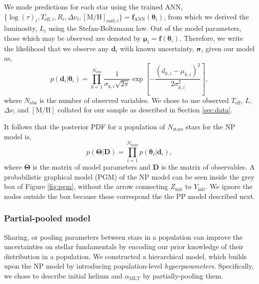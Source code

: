 \documentclass[fleqn,usenatbib]{mnras}
\newcommand{\dnu}{\ensuremath{\Delta\nu}}
\newcommand{\metallicity}{\ensuremath{[\mathrm{M}/\mathrm{H}]}}
\newcommand{\teff}{\ensuremath{T_\mathrm{eff}}}
\newcommand{\mlt}{\ensuremath{{\alpha_\mathrm{MLT}}}}
\begin{document}
We made predictions for each star using the trained ANN, $\{\log(\tau)_i, T_{\mathrm{eff}, i}, R_i, \dnu_i, \metallicity_{\mathrm{surf}, i}\} = \boldsymbol{f}_{\mathrm{ANN}}(\boldsymbol{\theta}_i)$, from which we derived the luminosity, $L_i$ using the Stefan-Boltzmann law. Out of the model parameters, those which may be observed are denoted by ${\boldsymbol{\mu}}_{i} = {\boldsymbol{f}}(\boldsymbol{\theta}_i)$. Therefore, we write the likelihood that we observe any $\boldsymbol{d}_i$ with known uncertainty, $\boldsymbol{\sigma}_{i}$ given our model as,
%
\begin{equation}
    p(\boldsymbol{d}_i | \boldsymbol{\theta}_i) = \prod_{k=1}^{N_\mathrm{obs}} \frac{1}{\sigma_{k, i} \sqrt{2\pi}} \exp\left[ - \frac{(d_{k, i} - \mu_{k, i})^2}{2 \sigma_{k, i}^2} \right],
    \label{eq:like}
\end{equation}
%
where $N_\mathrm{obs}$ is the number of observed variables. We chose to use observed $\teff$, $L$, $\dnu$, and $\metallicity$ collated for our sample as described in Section \ref{sec:data}.

It follows that the posterior PDF for a population of $N_\mathrm{stars}$ stars for the NP model is, 
%
\begin{equation}
    p(\boldsymbol{\Theta} | \boldsymbol{D}) = \prod_{i=1}^{N_{\mathrm{stars}}} p(\boldsymbol{\theta}_i | \boldsymbol{d}_i),   
\end{equation}
%
where $\boldsymbol{\Theta}$ is the matrix of model parameters and $\boldsymbol{D}$ is the matrix of observables. A probabilistic graphical model (PGM) of the NP model can be seen inside the grey box of Figure \ref{fig:pgm}, without the arrow connecting $Z_\mathrm{init}$ to $Y_\mathrm{init}$. We ignore the nodes outside the box because these correspond the the PP model described next.

\subsubsection{Partial-pooled model}\label{sec:pp}



Sharing, or pooling parameters between stars in a population can improve the uncertainties on stellar fundamentals by encoding our prior knowledge of their distribution in a population. We constructed a hierarchical model, which builds upon the NP model by introducing population-level \emph{hyperparameters}. Specifically, we chose to describe initial helium and $\mlt$ by partially-pooling them.
\end{document}
